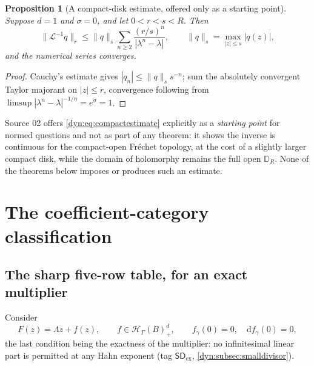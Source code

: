 \documentclass[11pt,letterpaper]{article}
\newtheorem{proposition}[proposition]{Proposition}
\theoremstyle{definition}
\theoremstyle{remark}
\newcommand{\HH}{\mathscr H}
\newcommand{\Li}{\mathcal L}
\newcommand{\sdex}{\mathsf{SD}_{\mathrm{ex}}}
\numberwithin{equation}{section}
\begin{document}
\begin{proposition}[A compact-disk estimate, offered only as a starting point]
\label{dyn:prop:norm}
Suppose $d=1$ and $\sigma=0$, and let $0<r<s<R$. Then
\begin{equation}\label{dyn:eq:compactestimate}
 \|\Li^{-1}q\|_{r}\le\|q\|_{s}\sum_{n\ge2}\frac{(r/s)^{n}}{|\lambda^{n}-\lambda|},
 \qquad \|q\|_{s}=\max_{|z|\le s}|q(z)|,
\end{equation}
and the numerical series converges.
\end{proposition}
\begin{proof}
Cauchy's estimate gives $|q_n|\le\|q\|_ss^{-n}$; sum the absolutely
convergent Taylor majorant on $|z|\le r$, convergence following from
$\limsup|\lambda^{n}-\lambda|^{-1/n}=e^{\sigma}=1$.
\end{proof}

Source 02 offers \eqref{dyn:eq:compactestimate} explicitly as a
\emph{starting point} for normed questions and not as part of any theorem:
it shows the inverse is continuous for the compact-open Fr\'echet topology,
at the cost of a slightly larger compact disk, while the domain of
holomorphy remains the full open $\mathbb D_R$. None of the theorems below
imposes or produces such an estimate.

\section{The coefficient-category classification}
\label{dyn:sec:categories}

\subsection{The sharp five-row table, for an exact multiplier}
Consider
\begin{equation}\label{dyn:eq:Fintro}
 F(z)=\Lambda z+f(z),\qquad f\in\HH_\Gamma(B)_+^{d},\qquad
 f_\gamma(0)=0,\quad \mathrm df_\gamma(0)=0 ,
\end{equation}
the last condition being the exactness of the multiplier: no infinitesimal
linear part is permitted at any Hahn exponent
(tag $\sdex$, \cref{dyn:subsec:smalldivisor}).
\end{document}
